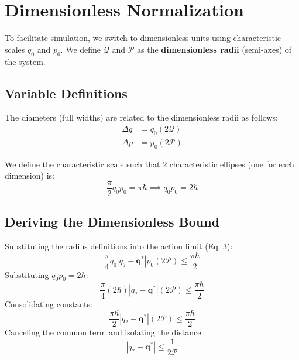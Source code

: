 \documentclass{article}
\begin{document}
\section{Dimensionless Normalization}

To facilitate simulation, we switch to dimensionless units using characteristic scales $q_0$ and $p_0$. We define $\mathcal{Q}$ and $\mathcal{P}$ as the \textbf{dimensionless radii} (semi-axes) of the system.

\subsection{Variable Definitions}
The diameters (full widths) are related to the dimensionless radii as follows:
\begin{align}
    \Delta q &= q_0 (2\mathcal{Q}) \\
    \Delta p &= p_0 (2\mathcal{P})
\end{align}

We define the characteristic scale such that 2 characteristic ellipses (one for each dimension) is:
\begin{equation}
    \frac{\pi}{2}q_0 p_0 = \pi\hbar \implies q_0 p_0 = 2\hbar
\end{equation}

\subsection{Deriving the Dimensionless Bound}
Substituting the radius definitions into the action limit (Eq. 3):
\begin{equation}
    \frac{\pi}{4} q_0 |q_{?} - \mathbf{q}^*| p_0 (2\mathcal{P}) \le \frac{\pi \hbar}{2}
\end{equation}
Substituting $q_0 p_0 = 2\hbar$:
\begin{equation}
    \frac{\pi}{4} (2\hbar) |q_{?} - \mathbf{q}^*| (2\mathcal{P}) \le \frac{\pi \hbar}{2}
\end{equation}
Consolidating constants:
\begin{equation}
    \frac{\pi \hbar}{2} |q_{?} - \mathbf{q}^*| (2\mathcal{P}) \le \frac{\pi \hbar}{2}
\end{equation}
Canceling the common term and isolating the distance:
\begin{equation}
    |q_{?} - \mathbf{q}^*| \le \frac{1}{2 \mathcal{P}}
\end{equation}
\end{document}
